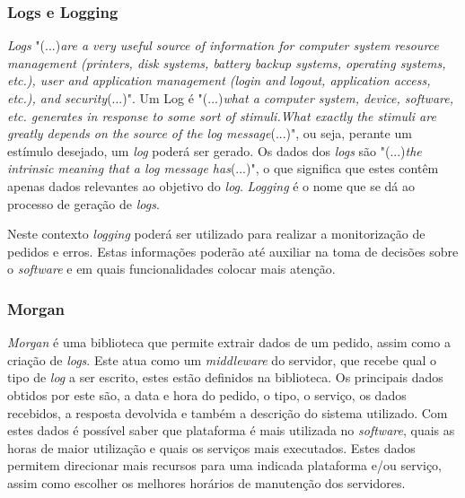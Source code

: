 \subsubsection{Logs e Logging}
\textit{Logs} "(...)\emph{are a very useful source of information for computer system resource management (printers, disk systems, battery backup systems, operating systems, etc.), user and application management (login and logout, application access, etc.), and security}(...)"\citep{Logging}. Um Log é "(...)\emph{what a computer system, device, software, etc. generates in response to some sort of stimuli.What exactly the stimuli are greatly depends on the source of the log message}(...)"\citep{Logging}, ou seja, perante um estímulo desejado, um \textit{log} poderá ser gerado. Os dados dos \textit{logs} são "(...)\emph{the intrinsic meaning that a log message has}(...)"\citep{Logging}, o que significa que estes contêm apenas dados relevantes ao objetivo do \textit{log}. \textit{Logging} é o nome que se dá ao processo de geração de \textit{logs}.

\newpage

Neste contexto \textit{logging} poderá ser utilizado para realizar a monitorização de pedidos e erros. Estas informações poderão até auxiliar na toma de decisões sobre o \textit{software} e em quais funcionalidades colocar mais atenção.

\subsubsection{Morgan}

\textit{Morgan} é uma biblioteca que permite extrair dados de um pedido, assim como a criação de \textit{logs}. Este atua como um \textit{middleware} do servidor, que recebe qual o tipo de \textit{log} a ser escrito, estes estão definidos na biblioteca. Os principais dados obtidos por este são, a data e hora do pedido, o tipo, o serviço, os dados recebidos, a resposta devolvida e também a descrição do sistema utilizado. Com estes dados é possível saber que plataforma é mais utilizada no \textit{software}, quais as horas de maior utilização e quais os serviços mais executados. Estes dados permitem direcionar mais recursos para uma indicada plataforma e/ou serviço, assim como escolher os melhores horários de manutenção dos servidores.